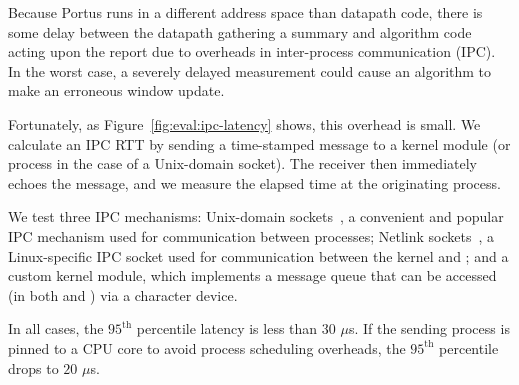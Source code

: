 Because Portus runs in a different address space than datapath code, there is some delay between the datapath gathering a summary and algorithm code acting upon the report due to overheads in inter-process
communication (IPC).
In the worst case, a severely delayed measurement could cause an algorithm to make an erroneous window update.

Fortunately, as Figure~\ref{fig:eval:ipc-latency} shows, this overhead is small. We calculate an IPC RTT by sending a time-stamped message to a kernel module (or \userspace{} process in the case of a Unix-domain socket). The receiver then immediately echoes the message, and we measure the elapsed time at the originating process.

We test three IPC mechanisms: Unix-domain sockets~\cite{unix-domain}, a convenient and popular IPC mechanism used for communication between \userspace{} processes; Netlink sockets~\cite{netlink}, a Linux-specific IPC socket used for communication between the kernel and \userspace{}; and a custom kernel module, which implements a message queue that can be accessed (in both \userspace{} and ) via a character device.

In all cases, the $95^{\text{th}}$ percentile latency is less than $30$ $\mu$s. If the sending process is pinned to a CPU core to avoid process scheduling overheads, the $95^{\text{th}}$ percentile drops to $20$ $\mu$s.

